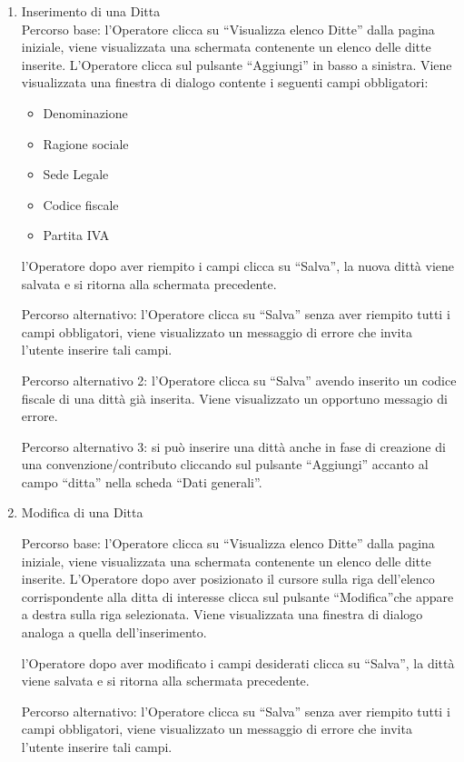 \begin{enumerate}
\begin{enumerate}
\item Inserimento di una Ditta\\ \label{UC_new_company}
Percorso base:
l'Operatore clicca su ``Visualizza elenco Ditte'' dalla pagina iniziale, viene visualizzata una schermata contenente un elenco delle ditte inserite. L'Operatore clicca sul pulsante ``Aggiungi'' in basso a sinistra. Viene visualizzata
una finestra di dialogo contente i seguenti campi obbligatori:
\begin{itemize}
 \item Denominazione
 \item Ragione sociale
 \item Sede Legale
 \item Codice fiscale
 \item Partita IVA
\end{itemize}
l'Operatore dopo aver riempito i campi clicca su ``Salva'', la nuova dittà viene salvata e si ritorna alla schermata precedente.

Percorso alternativo:
l'Operatore clicca su ``Salva'' senza aver riempito tutti i campi obbligatori, viene visualizzato un messaggio di errore che invita l'utente inserire tali campi.

Percorso alternativo 2:
l'Operatore clicca su ``Salva'' avendo inserito un codice fiscale di una dittà già inserita. Viene visualizzato un opportuno messagio di errore.

Percorso alternativo 3:
si può inserire una dittà anche in fase di creazione di una convenzione/contributo cliccando sul pulsante ``Aggiungi'' accanto al campo ``ditta'' nella scheda ``Dati generali''.

\item Modifica di una Ditta\\ \label{UC_edit_company}

Percorso base:
l'Operatore clicca su ``Visualizza elenco Ditte'' dalla pagina iniziale, viene visualizzata una schermata contenente un elenco delle ditte inserite. L'Operatore dopo aver posizionato il cursore sulla riga dell'elenco
corrispondente alla ditta di interesse clicca sul pulsante ``Modifica''che appare a destra sulla riga selezionata. Viene visualizzata
una finestra di dialogo analoga a quella dell'inserimento.

l'Operatore dopo aver modificato i campi desiderati clicca su ``Salva'', la  dittà viene salvata e si ritorna alla schermata precedente.

Percorso alternativo:
l'Operatore clicca su ``Salva'' senza aver riempito tutti i campi obbligatori, viene visualizzato un messaggio di errore che invita l'utente inserire tali campi.


\end{enumerate}
\end{enumerate}
